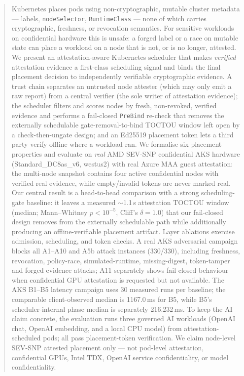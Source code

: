 \begin{abstract}
Kubernetes places pods using non-cryptographic, mutable cluster metadata --- labels,
\texttt{nodeSelector}, \texttt{RuntimeClass} --- none of which carries
cryptographic, freshness, or revocation semantics. For sensitive workloads on
confidential hardware this is unsafe: a forged label or a race on mutable state
can place a workload on a node that is not, or is no longer, attested. We present
an attestation-aware Kubernetes scheduler that makes \emph{verified} attestation
evidence a first-class scheduling signal and binds the final placement decision
to independently verifiable cryptographic evidence. A trust chain separates an
untrusted node attester (which may only emit a raw report) from a central
verifier (the sole writer of attestation evidence); the scheduler filters and
scores nodes by fresh, non-revoked, verified evidence and performs a fail-closed
\texttt{PreBind} re-check that removes the externally schedulable
gate-removal-to-bind TOCTOU window left open by a check-then-ungate design; and
an Ed25519 placement token lets a third party verify offline where a workload
ran. We formalise six
placement properties and evaluate on \emph{real} AMD SEV-SNP confidential AKS
hardware (Standard\_DC8as\_v6, westus2) with real Azure MAA guest attestation:
the multi-node snapshot contains four active confidential nodes with verified
real evidence, while empty/invalid tokens are never marked real. Our
central result is a head-to-head comparison with a strong scheduling-gate
baseline: it leaves a measured $\sim$1.1\,s attestation TOCTOU window (median;
Mann--Whitney $p<10^{-5}$, Cliff's $\delta{=}1.0$) that our fail-closed design
removes from the externally schedulable path while additionally producing an
offline-verifiable placement artifact. Layer ablations exercise admission,
scheduling, and token checks. A real AKS adversarial campaign blocks all A1--A10
and A5b attack instances (330/330), including
freshness, revocation, policy-race, simulated-runtime, missing-digest,
token-tamper and forged evidence attacks; A11 separately shows fail-closed
behaviour when confidential GPU attestation is requested but not available. The AKS B1--B5 latency campaign
uses 30 measured runs per baseline; the comparable client-observed median is
1167.0\,ms for B5, while B5's scheduler-internal phase median is separately
216.232\,ms. To keep the AI claim concrete, the evaluation runs three governed
AI workloads (OpenAI chat, OpenAI embedding, and a local CPU model) from
attestation-scheduled pods; all pass placement-token verification. We claim
node-level SEV-SNP attested placement only --- not pod-level attestation,
confidential GPUs, Intel TDX, OpenAI service confidentiality, or model
confidentiality.
\end{abstract}
